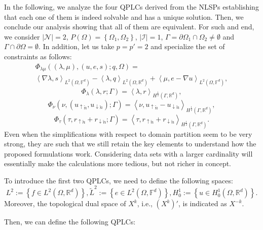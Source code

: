 In the following, we analyze the four QPLCs derived from the NLSPs establishing that each one of them is indeed solvable and has a unique solution. Then, we conclude our analysis showing that all of them are equivalent. For such and end, we consider $|\mathcal{N}| = 2$, $P(\Omega) = \left\{\Omega_1, \Omega_2\right\}$, $|\mathcal{I}| = 1$, $\Gamma = \partial \Omega_1 \cap \Omega_2 \neq \emptyset$ and $\Gamma \cap \partial \Omega = \emptyset$. In addition, let us take $p = p' = 2$ and specialize the set of constraints as follows:
\begin{multline}
\Phi_{\lambda \mu}((\lambda, \mu), (u, e, s); q, \Omega) = \\
\left\langle \nabla \lambda, s \right\rangle_{L^2(\Omega, \mathbb{F}^d)}-
\left\langle \lambda, q \right\rangle_{L^2(\Omega,\mathbb{R}^d)}+
\left\langle \mu, e - \nabla u \right\rangle_{L^2(\Omega,\mathbb{F}^d)},
\end{multline}
%
\begin{equation}
    \Phi_{\lambda}(\lambda, r;\Gamma) = \left \langle \lambda , r \right\rangle_{H^{\frac12}(\Gamma, \mathbb{R}^d)},
\end{equation}
%
\begin{equation}
    \Phi_{\nu}(\nu, (u_{\uparrow\check{n}}, u_{\downarrow\check{n}});\Gamma) = \left \langle \nu , u_{\uparrow\check{n}} - u_{\downarrow\check{n}} \right\rangle_{H^{\frac12}(\Gamma, \mathbb{R}^d)},
\end{equation}
\begin{equation}
    \Phi_{\tau}(\tau,r_{\uparrow \check{n}}+r_{\downarrow \check{n}};\Gamma) =  \left \langle \tau , r_{\uparrow\check{n}} + r_{\downarrow\check{n}} \right\rangle_{H^{\frac12}(\Gamma, \mathbb{R}^d)}.
\end{equation}
Even when the simplifications with respect to domain partition seem to be very strong, they are such that we still retain the key elements to understand how the proposed formulations work. Considering data sets with a larger cardinality will essentially make the calculations more tedious, but not richer in concept.

To introduce the first two QPLCs, we need to define the following spaces:
$$L^2 := \left\{ f \in L^2(\Omega, \mathbb{R}^d) \right\},
\tilde{L}^2 := \left\{ e \in L^2(\Omega, \mathbb{F}^d) \right\},
H^1_{0} := \left\{ u \in H^1_0(\Omega, \mathbb{R}^d) \right\}.$$
Moreover, the topological dual space of $X^k$, i.e., $\left(X^k\right)'$, is indicated as $X^{-k}$.

Then, we can define the following QPLCs:

